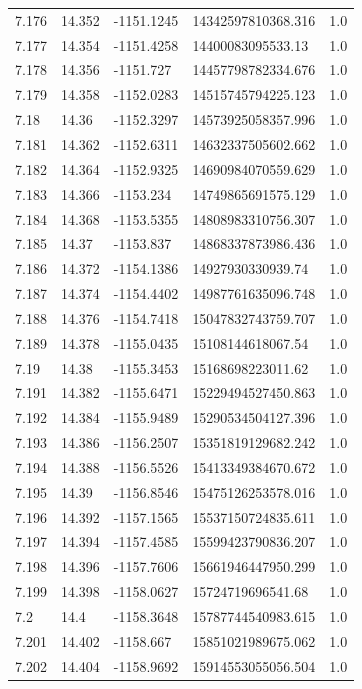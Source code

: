 \begin{tabular}{lllll}
7.176 & 14.352 & -1151.1245 & 14342597810368.316 & 1.0 \\
7.177 & 14.354 & -1151.4258 & 14400083095533.13 & 1.0 \\
7.178 & 14.356 & -1151.727 & 14457798782334.676 & 1.0 \\
7.179 & 14.358 & -1152.0283 & 14515745794225.123 & 1.0 \\
7.18 & 14.36 & -1152.3297 & 14573925058357.996 & 1.0 \\
7.181 & 14.362 & -1152.6311 & 14632337505602.662 & 1.0 \\
7.182 & 14.364 & -1152.9325 & 14690984070559.629 & 1.0 \\
7.183 & 14.366 & -1153.234 & 14749865691575.129 & 1.0 \\
7.184 & 14.368 & -1153.5355 & 14808983310756.307 & 1.0 \\
7.185 & 14.37 & -1153.837 & 14868337873986.436 & 1.0 \\
7.186 & 14.372 & -1154.1386 & 14927930330939.74 & 1.0 \\
7.187 & 14.374 & -1154.4402 & 14987761635096.748 & 1.0 \\
7.188 & 14.376 & -1154.7418 & 15047832743759.707 & 1.0 \\
7.189 & 14.378 & -1155.0435 & 15108144618067.54 & 1.0 \\
7.19 & 14.38 & -1155.3453 & 15168698223011.62 & 1.0 \\
7.191 & 14.382 & -1155.6471 & 15229494527450.863 & 1.0 \\
7.192 & 14.384 & -1155.9489 & 15290534504127.396 & 1.0 \\
7.193 & 14.386 & -1156.2507 & 15351819129682.242 & 1.0 \\
7.194 & 14.388 & -1156.5526 & 15413349384670.672 & 1.0 \\
7.195 & 14.39 & -1156.8546 & 15475126253578.016 & 1.0 \\
7.196 & 14.392 & -1157.1565 & 15537150724835.611 & 1.0 \\
7.197 & 14.394 & -1157.4585 & 15599423790836.207 & 1.0 \\
7.198 & 14.396 & -1157.7606 & 15661946447950.299 & 1.0 \\
7.199 & 14.398 & -1158.0627 & 15724719696541.68 & 1.0 \\
7.2 & 14.4 & -1158.3648 & 15787744540983.615 & 1.0 \\
7.201 & 14.402 & -1158.667 & 15851021989675.062 & 1.0 \\
7.202 & 14.404 & -1158.9692 & 15914553055056.504 & 1.0 \\

\end{tabular}
